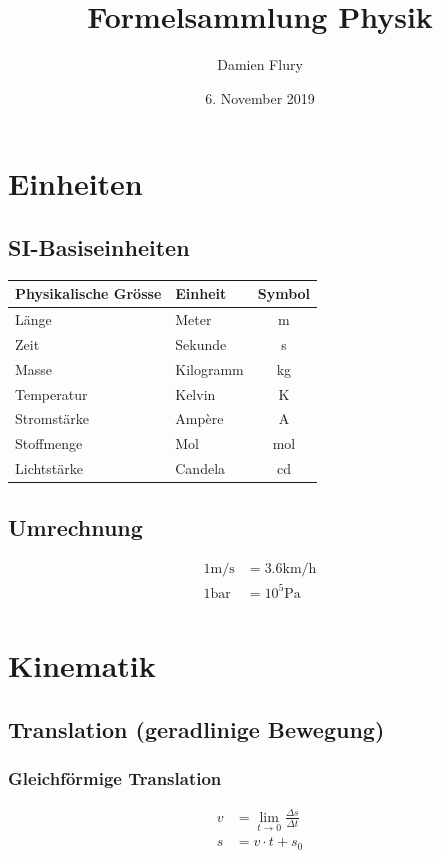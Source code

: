 \documentclass[a4paper]{IEEEtran}
\title{Formelsammlung Physik}
\date{6. November 2019}
\author{Damien Flury}
\begin{document}
  \maketitle
  \section{Einheiten}
  \subsection{SI-Basiseinheiten}
    \begin{tabular}{|l|l|c|}
      \hline
      \textbf{Physikalische Grösse} & \textbf{Einheit} & \textbf{Symbol} \\ \hline \hline
      Länge & Meter & m \\
      Zeit & Sekunde & s \\
      Masse & Kilogramm & kg \\
      Temperatur & Kelvin & K \\
      Stromstärke & Ampère & A \\
      Stoffmenge & Mol & mol \\
      Lichtstärke & Candela & cd \\
      \hline
    \end{tabular}
  \subsection{Umrechnung}
  \begin{align}
    1 \si{\metre\per\second} &= 3.6 \si{\kilo\metre\per\hour}\\
    1 \si{\bar} &= 10^5 \si{\pascal} \\
  \end{align}
  \section{Kinematik}
  \subsection{Translation (geradlinige Bewegung)}
  \subsubsection{Gleichförmige Translation}
  \begin{align}
    v &= \lim_{t \to 0} \frac{\Delta{}s}{\Delta{}t} \\
    s &= v \cdot t + s_0
  \end{align}
\end{document}
